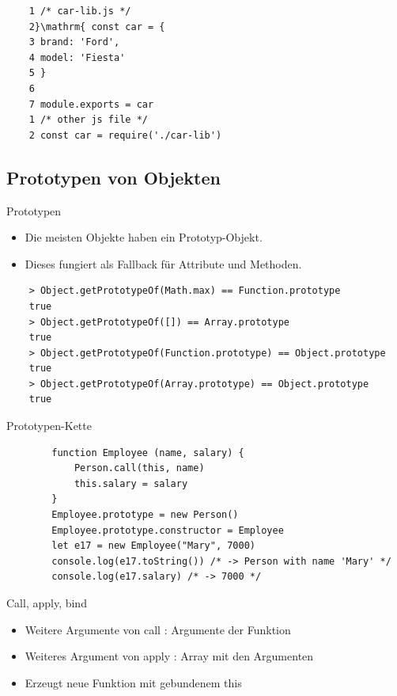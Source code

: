 \begin{verbatim}
    1 /* car-lib.js */
    2}\mathrm{ const car = {
    3 brand: 'Ford',
    4 model: 'Fiesta'
    5 }
    6
    7 module.exports = car
    1 /* other js file */
    2 const car = require('./car-lib')
\end{verbatim}

\subsection{Prototypen von Objekten}

\begin{definition}{Prototypen}
    \begin{itemize}
        \item Die meisten Objekte haben ein Prototyp-Objekt.
        \item Dieses fungiert als Fallback für Attribute und Methoden.
      \end{itemize}
\end{definition}

\begin{verbatim}
    > Object.getPrototypeOf(Math.max) == Function.prototype
    true
    > Object.getPrototypeOf([]) == Array.prototype
    true
    > Object.getPrototypeOf(Function.prototype) == Object.prototype
    true
    > Object.getPrototypeOf(Array.prototype) == Object.prototype
    true
\end{verbatim}

\begin{code}{Prototypen-Kette}
    \begin{verbatim}
        function Employee (name, salary) {
            Person.call(this, name)
            this.salary = salary
        }
        Employee.prototype = new Person()
        Employee.prototype.constructor = Employee
        let e17 = new Employee("Mary", 7000)
        console.log(e17.toString()) /* -> Person with name 'Mary' */
        console.log(e17.salary) /* -> 7000 */
        \end{verbatim}
        
        Call, apply, bind
        
        \begin{itemize}
          \item Weitere Argumente von call : Argumente der Funktion
          \item Weiteres Argument von apply : Array mit den Argumenten
          \item Erzeugt neue Funktion mit gebundenem this
        \end{itemize}
\end{code}

